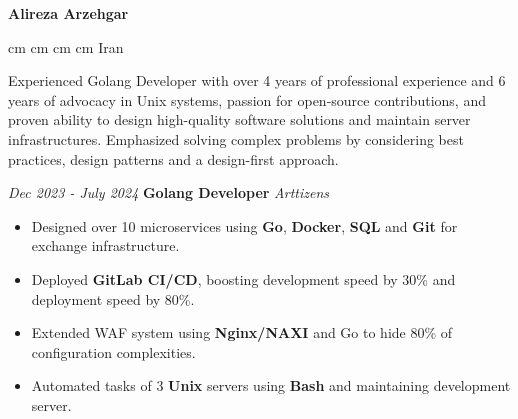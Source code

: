\documentclass{engineercv}
\begin{document}
\begin{center}
  \textbf{\fontsize{24 pt}{24 pt}\selectfont Alireza Arzehgar}

  \vspace{0.2 cm}

  \scriptsize
  \mbox{}
   cm
  \mbox{}
   cm
  \mbox{}
   cm
  \mbox{}
   cm
  \mbox{{\color{black}\footnotesize\faMapMarker*}\hspace*{0.13cm}Iran}
\end{center}


Experienced Golang Developer with over 4 years of professional experience and 6 years of advocacy in Unix systems,
passion for open-source contributions, and proven ability to design high-quality software solutions and
maintain server infrastructures. Emphasized solving complex problems by considering best practices,
design patterns and a design-first approach.

\begin{twocolentry}{\textit{Dec 2023 - July 2024}}
  \textbf{Golang Developer}
  \textit{Arttizens}
\end{twocolentry}

\begin{itemize}
  \item Designed over 10 microservices using \textbf{Go}, \textbf{Docker}, \textbf{SQL} and \textbf{Git} for exchange infrastructure.
  \item Deployed \textbf{GitLab CI/CD}, boosting development speed by 30\% and deployment speed by 80\%.
  \item Extended WAF system using \textbf{Nginx/NAXI} and Go to hide 80\% of configuration complexities.
  \item Automated tasks of 3 \textbf{Unix} servers using \textbf{Bash} and maintaining development server.
\end{itemize}
\end{document}
